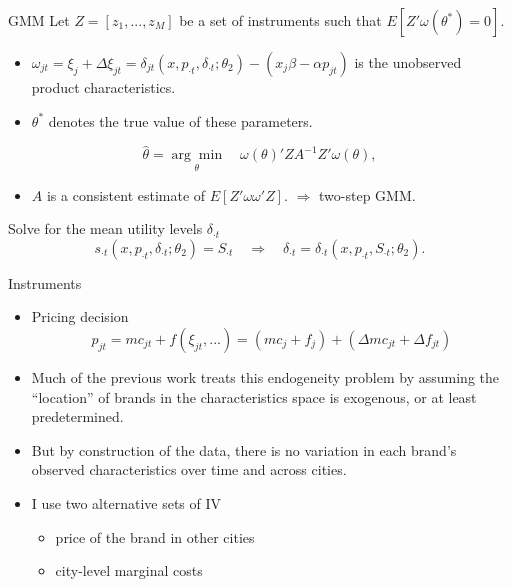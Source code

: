 \documentclass{beamer}
\begin{document}
\begin{frame}{GMM}
	Let $Z=[z_1,...,z_M]$ be a set of instruments such that $E[Z'\omega(\theta^*)=0]$.
	\begin{itemize}
		\item $\omega_{jt}=\xi_j+\Delta\xi_{jt}=\delta_{jt}(x,p_{\cdot t},\delta_{\cdot t};\theta_2)-(x_j\beta-\alpha p_{jt})$ is the unobserved product characteristics.
		\item $\theta^*$ denotes the true value of these parameters.
	\end{itemize}

	\begin{equation}
		\hat{\theta}=\underset{\theta}{\arg\min}\quad \omega(\theta)'ZA^{-1}Z'\omega(\theta),
	\end{equation}

	\begin{itemize}
		\item $A$ is a consistent estimate of $E[Z'\omega\omega'Z]$. $\Rightarrow$ two-step GMM.
	\end{itemize}
	\medskip

	Solve for the mean utility levels $\delta_{\cdot t}$
	\begin{equation}
		s_{\cdot t}(x,p_{\cdot t},\delta_{\cdot t};\theta_2)=S_{\cdot t} \quad\Rightarrow\quad \delta_{\cdot t}=\delta_{\cdot t}(x,p_{\cdot t},S_{\cdot t};\theta_2).
	\end{equation}
\end{frame}
\begin{frame}{Instruments}
	\begin{itemize}
		\item Pricing decision
		\begin{equation}
			p_{jt}=mc_{jt}+f(\xi_{jt},...)=(mc_j+f_j)+(\Delta mc_{jt}+\Delta f_{jt})
		\end{equation}
		\item Much of the previous work treats this endogeneity problem by assuming the “location” of brands in the characteristics space is exogenous, or at least predetermined.
		\item But by construction of the data, there is no variation in each brand’s observed characteristics over time and across cities.
		\item I use two alternative sets of IV
		\begin{itemize}
			\item price of the brand in other cities
			\item city-level marginal costs
		\end{itemize}
	\end{itemize}
\end{frame}
\end{document}
